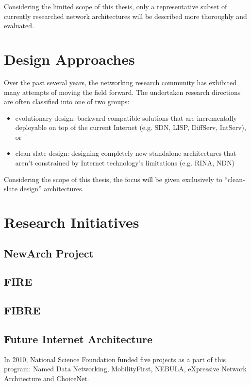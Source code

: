     Considering the limited scope of this thesis, only a representative subset of currently researched network architectures will be described more thoroughly and evaluated.

    \section{Design Approaches}

        Over the past several years, the networking research community has exhibited many attempts of moving the field forward. The undertaken research directions are often classified into one of two groups:

        \begin{itemize}
            \item evolutionary design: backward-compatible solutions that are incrementally deployable on top of the current Internet (e.g. SDN, LISP, DiffServ, IntServ), or
            \item clean slate design: designing completely new standalone architectures that aren't constrained by Internet technology's limitations (e.g. RINA, NDN)
        \end{itemize}

        Considering the scope of this thesis, the focus will be given exclusively to ``clean-slate design'' architectures.

    \section{Research Initiatives}
        \subsection{NewArch Project}
        \subsection{FIRE}
        \subsection{FIBRE}
        \subsection{Future Internet Architecture}
            In 2010, National Science Foundation funded five projects as a part of this program: Named Data Networking, MobilityFirst, NEBULA, eXpressive Network Architecture and ChoiceNet.


